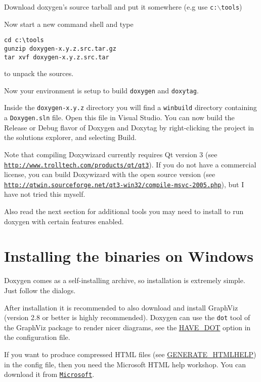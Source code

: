 Download doxygen's source tarball and put it somewhere (e.g use {\tt c:$\backslash$tools})

Now start a new command shell and type 

\footnotesize\begin{verbatim}
cd c:\tools
gunzip doxygen-x.y.z.src.tar.gz
tar xvf doxygen-x.y.z.src.tar
\end{verbatim}
\normalsize
 to unpack the sources.

Now your environment is setup to build {\tt doxygen} and {\tt doxytag}.

Inside the {\tt doxygen-x.y.z} directory you will find a {\tt winbuild} directory containing a {\tt Doxygen.sln} file. Open this file in Visual Studio. You can now build the Release or Debug flavor of Doxygen and Doxytag by right-clicking the project in the solutions explorer, and selecting Build.

Note that compiling Doxywizard currently requires Qt version 3 (see \href{http://www.trolltech.com/products/qt/qt3}{\tt http://www.trolltech.com/products/qt/qt3}). If you do not have a commercial license, you can build Doxywizard with the open source version (see \href{http://qtwin.sourceforge.net/qt3-win32/compile-msvc-2005.php}{\tt http://qtwin.sourceforge.net/qt3-win32/compile-msvc-2005.php}), but I have not tried this myself.

Also read the next section for additional tools you may need to install to run doxygen with certain features enabled.\hypertarget{install_install_bin_windows}{}\section{Installing the binaries on Windows}\label{install_install_bin_windows}
Doxygen comes as a self-installing archive, so installation is extremely simple. Just follow the dialogs.

After installation it is recommended to also download and install GraphViz (version 2.8 or better is highly recommended). Doxygen can use the {\tt dot} tool of the GraphViz package to render nicer diagrams, see the \hyperlink{config_cfg_have_dot}{HAVE\_\-DOT} option in the configuration file.

If you want to produce compressed HTML files (see \hyperlink{config_cfg_generate_htmlhelp}{GENERATE\_\-HTMLHELP}) in the config file, then you need the Microsoft HTML help workshop. You can download it from \href{http://msdn.microsoft.com/library/default.asp?url=/library/en-us/htmlhelp/html/vsconHH1Start.asp}{\tt Microsoft}.

